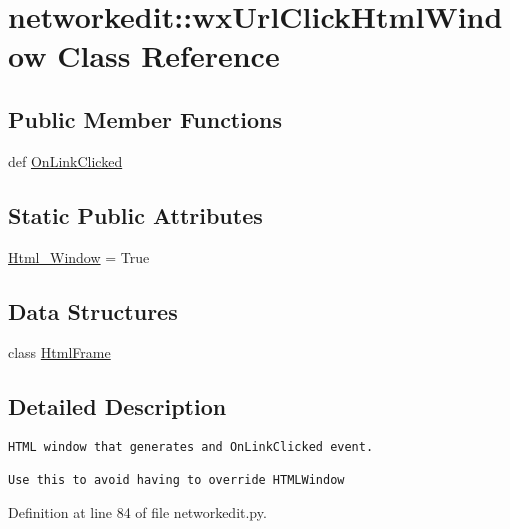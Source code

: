 \hypertarget{classnetworkedit_1_1wxUrlClickHtmlWindow}{
\section{networkedit::wx\-Url\-Click\-Html\-Window Class Reference}
\label{classnetworkedit_1_1wxUrlClickHtmlWindow}
}
\subsection*{Public Member Functions}
\begin{CompactItemize}
\item 
def \hyperlink{classnetworkedit_1_1wxUrlClickHtmlWindow_5771c9faa8f337f6a279ac395a31f037}{On\-Link\-Clicked}
\end{CompactItemize}
\subsection*{Static Public Attributes}
\begin{CompactItemize}
\item 
\hyperlink{classnetworkedit_1_1wxUrlClickHtmlWindow_afbd518c3d5d17bfd1e0241e77f26c27}{Html\_\-Window} = True
\end{CompactItemize}
\subsection*{Data Structures}
\begin{CompactItemize}
\item 
class \hyperlink{classnetworkedit_1_1wxUrlClickHtmlWindow_1_1HtmlFrame}{Html\-Frame}
\end{CompactItemize}


\subsection{Detailed Description}


\footnotesize\begin{verbatim}HTML window that generates and OnLinkClicked event.

Use this to avoid having to override HTMLWindow
\end{verbatim}
\normalsize
 



Definition at line 84 of file networkedit.py.

